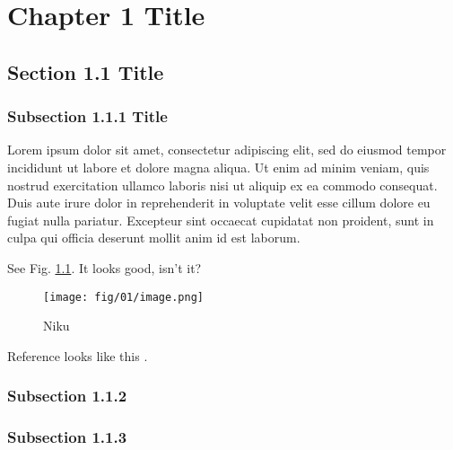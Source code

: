 \chapter{Chapter 1 Title}

\section{Section 1.1 Title}


\subsection{Subsection 1.1.1 Title}

Lorem ipsum dolor sit amet, consectetur adipiscing elit, sed do eiusmod tempor incididunt ut labore et dolore magna aliqua. Ut enim ad minim veniam, quis nostrud exercitation ullamco laboris nisi ut aliquip ex ea commodo consequat. Duis aute irure dolor in reprehenderit in voluptate velit esse cillum dolore eu fugiat nulla pariatur. Excepteur sint occaecat cupidatat non proident, sunt in culpa qui officia deserunt mollit anim id est laborum.

See Fig. \ref{fig:beef}. It looks good, isn't it?

\begin{figure}
\begin{center}
\texttt{[image: fig/01/image.png]}
\end{center}
\caption{Niku}
\label{fig:beef}
\end{figure}

Reference looks like this \cite{PDG2020}.


\subsection{Subsection 1.1.2}


\subsection{Subsection 1.1.3}


